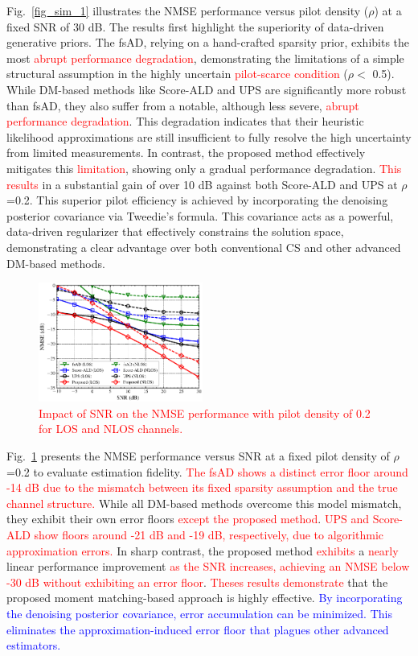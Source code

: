 \documentclass[lettersize,journal]{IEEEtran}
\newcommand{\tred}{\textcolor{red}}
\newcommand{\tblue}{\textcolor{blue}}
\begin{document}
Fig.~\ref{fig_sim_1} illustrates the NMSE performance versus pilot density ($\rho$) at a fixed SNR of 30 dB. The results first highlight the superiority of data-driven generative priors. The fsAD, relying on a hand-crafted sparsity prior, exhibits the most \tred{abrupt performance degradation}, demonstrating the limitations of a simple structural assumption in the highly uncertain \tred{pilot-scarce condition} ($\rho<$ 0.5).
While DM-based methods like Score-ALD and UPS are significantly more robust than fsAD, they also suffer from a notable, although less severe, \tred{abrupt performance degradation}. This degradation indicates that their heuristic likelihood approximations are still insufficient to fully resolve the high uncertainty from limited measurements.
In contrast, the proposed method effectively mitigates this \tred{limitation}, showing only a gradual performance degradation. \tred{This results} in a substantial gain of over 10 dB against both Score-ALD and UPS at $\rho$=0.2. This superior pilot efficiency is achieved by incorporating the denoising posterior covariance via Tweedie's formula. This covariance acts as a powerful, data-driven regularizer that effectively constrains the solution space, demonstrating a clear advantage over both conventional CS and other advanced DM-based methods.

\begin{figure}[!t]
\includegraphics[width=0.48\textwidth]{images/20251014/fig_2.eps}
\caption{\tred{Impact of SNR on the NMSE performance with pilot density of 0.2 for LOS and NLOS channels.}}
\label{fig_sim_2}
\end{figure}

Fig.~\ref{fig_sim_2} presents the NMSE performance versus SNR at a fixed pilot density of $\rho$=0.2 to evaluate estimation fidelity. \tred{The fsAD shows a distinct error floor around -14 dB due to the mismatch between its fixed sparsity assumption and the true channel structure.} While all DM-based methods overcome this model mismatch, they exhibit their own error floors \tred{except the proposed method}. \tred{UPS and Score-ALD show floors around -21 dB and -19 dB, respectively, due to algorithmic approximation errors.} In sharp contrast, the proposed method \tred{exhibits} a \tred{nearly} linear performance improvement \tred{as the SNR increases, achieving an NMSE below -30 dB without exhibiting an error floor}. \tred{Theses results demonstrate} that the proposed moment matching-based approach is highly effective. \tblue{By incorporating the denoising posterior covariance, error accumulation can be minimized. This eliminates the approximation-induced error floor that plagues other advanced estimators.} %
\end{document}
